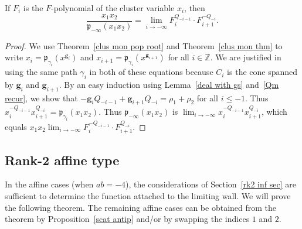 \documentclass[ALCO,ThmDefs,Unicode,epreuves]{cedram}
\newcommand{\integers}{\mathbb Z}
\newcommand{\p}{{\mathfrak p}}
\newcommand{\g}{\mathbf{g}}
\begin{document}
\begin{prop}\label{p inf lim}
If $F_i$ is the $F$-polynomial of the cluster variable $x_i$, then
\begin{equation}\label{p inf lim eq}
\frac{x_1x_2}{\p_{-\infty}(x_1x_2)}=\lim_{i\to-\infty}F_i^{Q_{-i-1}}\cdot F_{i+1}^{-Q_{-i}}.
\end{equation}
\end{prop}
\begin{proof}
We use Theorem~\ref{clus mon pop root} and Theorem~\ref{clus mon thm} to write $x_i=\p_{\gamma_i}(x^{\g_i})$ and $x_{i+1}=\p_{\gamma_i}(x^{\g_{i+1}})$ for all $i\in\integers$.
We are justified in using the same path $\gamma_i$ in both of these equations because $C_i$ is the cone spanned by $\g_i$ and $\g_{i+1}$.
By an easy induction using Lemma~\ref{deal with gs} and~\eqref{Qm recur}, we show that $-\g_iQ_{-i-1}+\g_{i+1}Q_{-i}=\rho_1+\rho_2$ for all $i\le-1$.
Thus $x_i^{-Q_{-i-1}}x_{i+1}^{Q_{-i}}=\p_{\gamma_i}(x_1x_2)$.
Thus $\p_{-\infty}(x_1x_2)$ is $\lim_{i\to-\infty}x_i^{-Q_{-i-1}}x_{i+1}^{Q_{-i}}$, which equals $x_1x_2\lim_{i\to-\infty}F_i^{-Q_{-i-1}}\cdot F_{i+1}^{Q_{-i}}$.
\end{proof}

\subsection{Rank-2 affine type}\label{affrk2 sec}
In the affine cases (when $ab=-4$), the considerations of Section~\ref{rk2 inf sec} are sufficient to determine the function attached to the limiting wall.
We will prove the following theorem.
The remaining affine cases can be obtained from the theorem by Proposition~\ref{scat antip} and/or by swapping the indices $1$ and $2$.
\end{document}
